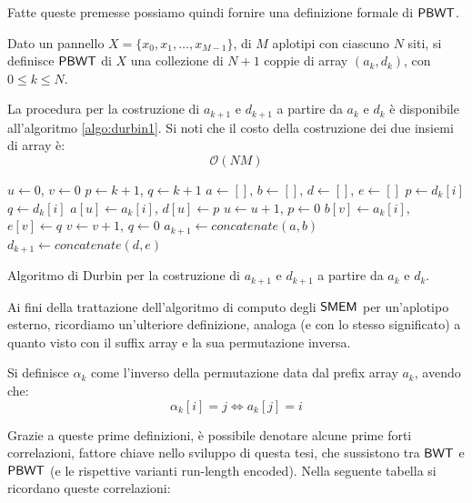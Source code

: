 \noindent
Fatte queste premesse possiamo quindi fornire una definizione formale di
$\mbox{\rm {\sf PBWT}}$.
\begin{definizione}
  Dato un pannello $X=\{x_0,x_1,\ldots,x_{M-1}\}$, di $M$ aplotipi con ciascuno
  $N$ siti, si definisce $\mbox{\rm {\sf PBWT}}$ di $X$ una
  collezione di $N+1$ coppie di array $(a_k,d_k)$, con $0\leq k\leq N$.
\end{definizione}
La procedura per la costruzione di $a_{k+1}$ e $d_{k+1}$ a partire da $a_k$ e
$d_k$ è disponibile all'algoritmo \ref{algo:durbin1}. Si noti che
il costo della costruzione dei due insiemi di array è:
\begin{equation}
  \label{eq:pbwtadtime}
  \mathcal{O}(NM)
\end{equation}
\begin{algorithm}
  \small
  \begin{algorithmic}[1]
    \State $u\gets 0$, $v\gets 0$
    \State $p\gets k+1$, $q\gets k+1$
    \State $a\gets []$, $b\gets []$, $d\gets []$, $e\gets []$
    \State $p\gets d_k[i]$
    \EndIf
    \State $q\gets d_k[i]$
    \EndIf
    \State $a[u]\gets a_k[i]$, $d[u]\gets p$
    \State $u\gets u+1$, $p\gets 0$
    \Else
    \State $b[v]\gets a_k[i]$, $e[v]\gets q$
    \State $v\gets v+1$, $q\gets 0$
    \EndIf
    \EndFor
    \State $a_{k+1}\gets concatenate(a,b)$
    \State $d_{k+1}\gets concatenate(d,e)$ 
    \EndFunction
  \end{algorithmic}
  \caption{Algoritmo di Durbin per la costruzione di $a_{k+1}$ e $d_{k+1}$ a
  partire da $a_{k}$ e $d_{k}$.}
  \label{algo:durbin1}
\end{algorithm}
Ai fini della trattazione dell'algoritmo di computo degli $\mbox{\rm {\sf SMEM}}$ per
un'aplotipo esterno,
ricordiamo un'ulteriore definizione, analoga (e con lo stesso significato)
a quanto visto con il suffix array e la sua permutazione inversa. 
\begin{definizione}
  Si definisce $\alpha_k$ come l'inverso della permutazione data dal
  prefix array $a_k$, avendo che:
  \[\alpha_k[i]=j \iff a_k[j]=i\]
\end{definizione}
Grazie a queste prime definizioni, è possibile denotare alcune prime forti
correlazioni, fattore chiave nello sviluppo di questa tesi, che sussistono tra
$\mbox{\rm {\sf BWT}}$ e $\mbox{\rm {\sf PBWT}}$ (e le rispettive varianti run-length
  encoded). Nella seguente tabella si ricordano queste correlazioni:
